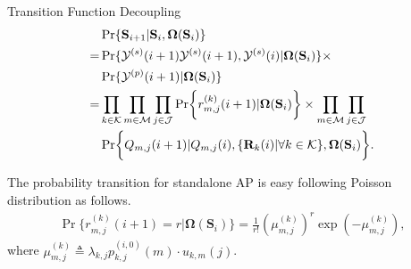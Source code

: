 \documentclass[10pt, conference, letterpaper]{IEEEtran}
\newcommand{\define}{\triangleq}
\renewcommand{\vec}{\mathbf}
\DeclarePairedDelimiter{\set}{\{}{\}}
\DeclarePairedDelimiter{\Brace}{\bigg\{}{\bigg\}}
\newcommand{\apSet}{\mathcal{K}}
\newcommand{\esSet}{\mathcal{M}}
\newcommand{\jSpace}{\mathcal{J}}
\newcommand{\Stat}{\mathbf{S}}
\newcommand{\Obsv}{\mathcal{Y}}
\newcommand{\Policy}{\boldsymbol{\Omega}}
\newcommand{\BPolicy}{\Policy} %
\begin{document}
    \begin{section}{Transition Function Decoupling}
        \label{trans-decouple}
        \begin{align}
            & \Pr\{\Stat_{i+1}|\Stat_{i}, \BPolicy(\Stat_{i})\}
            \nonumber\\
            =& \Pr\{\Obsv^{(s)}(i+1)\Obsv^{(s)}(i+1), \Obsv^{(s)}(i)|\BPolicy(\Stat_{i})\} \times
                \nonumber\\
                &\Pr\{\Obsv^{(p)}(i+1)|\BPolicy(\Stat_{i})\}
            \nonumber\\
            =& \prod_{k\in\apSet}\prod_{m\in\esSet}\prod_{j\in\jSpace}
                    \Pr\Brace{r^{(k)}_{m,j}(i+1)|\BPolicy(\Stat_{i})}
                    \times \prod_{m\in\esSet}\prod_{j\in\jSpace}
                \nonumber\\
                & \Pr\Brace{Q_{m,j}(i+1)|Q_{m,j}(i), \set{\vec{R}_k(i)|\forall k\in\apSet}, \BPolicy(\Stat_{i})}.
        \end{align}
        
        The probability transition for standalone AP is easy following Poisson distribution as follows.
        \begin{align}
            \Pr\{r^{(k)}_{m,j}(i+1)=r|\BPolicy(\Stat_{i})\} = \frac{1}{r!}(\mu^{(k)}_{m,j})^r \exp(-\mu^{(k)}_{m,j}),
        \end{align}
        where $\mu^{(k)}_{m,j} \define \lambda_{k,j} p^{(i,0)}_{k,j}(m) \cdot u_{k,m}(j)$.
        

\end{section}
\end{document}

